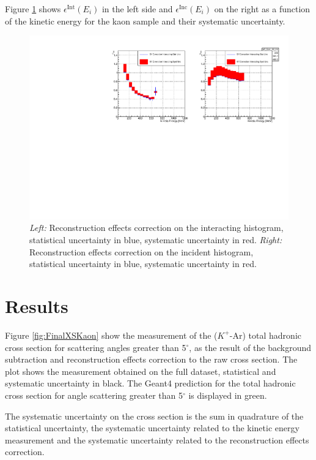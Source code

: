 Figure \ref{fig:EffCorrK} shows $\epsilon^{\text{Int}}(E_{i})$ in the left side and $ \epsilon^{\text{Inc}}(E_i)$ on the right as a function of the kinetic energy for the kaon sample and their systematic uncertainty. 


\begin{figure}
\centering
\includegraphics[width=\textwidth]{Chapter-7/Images/EffCorrK.pdf}
\caption{\emph{Left:} Reconstruction  effects correction on the interacting histogram, statistical uncertainty in blue, systematic uncertainty in red. \emph{Right:}  Reconstruction  effects  correction on the incident histogram, statistical uncertainty in blue, systematic uncertainty in red.}
\label{fig:EffCorrK}
\end{figure}



\section{Results}\label{ch:FinalKaon}
Figure \ref{fig:FinalXSKaon} show the measurement of the ($K^+$-Ar) total hadronic cross section for  scattering angles greater than 5$^\circ$, as the result of the background subtraction and reconstruction  effects  correction to the raw cross section. The plot shows the measurement obtained on the full dataset, statistical and systematic uncertainty in black. The Geant4 prediction for the total hadronic cross section for angle scattering greater than 5$^\circ$ is displayed in green.

The systematic uncertainty on the cross section is the sum in quadrature of the statistical uncertainty, the systematic uncertainty related to the kinetic energy measurement and the systematic uncertainty related to the reconstruction  effects  correction.

